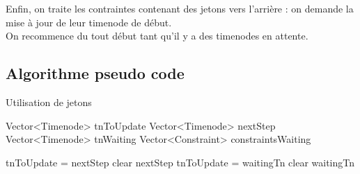 \documentclass[10pt,a4paper]{article}
\begin{document}
Enfin, on traite les contraintes contenant des jetons vers l'arrière : on demande la mise à jour de leur timenode de début.\\

On recommence du tout début tant qu'il y a des timenodes en attente.


	\subsection{Algorithme pseudo code}

Utilisation de jetons

	\begin{algorithm}
		\begin{algorithmic}[2]
			\State Vector<Timenode> tnToUpdate
			\State Vector<Timenode> nextStep
			\State Vector<Timenode> tnWaiting
			\State Vector<Constraint> constraintsWaiting
			\State
			
				 
						\State {}
					\EndFor
					\State tnToUpdate = nextStep
					\State clear nextStep
				\EndWhile
				\State tnToUpdate = waitingTn
				\State clear waitingTn
					\State {}
				\EndFor
			\EndWhile
		\end{algorithmic}
	\end{algorithm}
\end{document}
